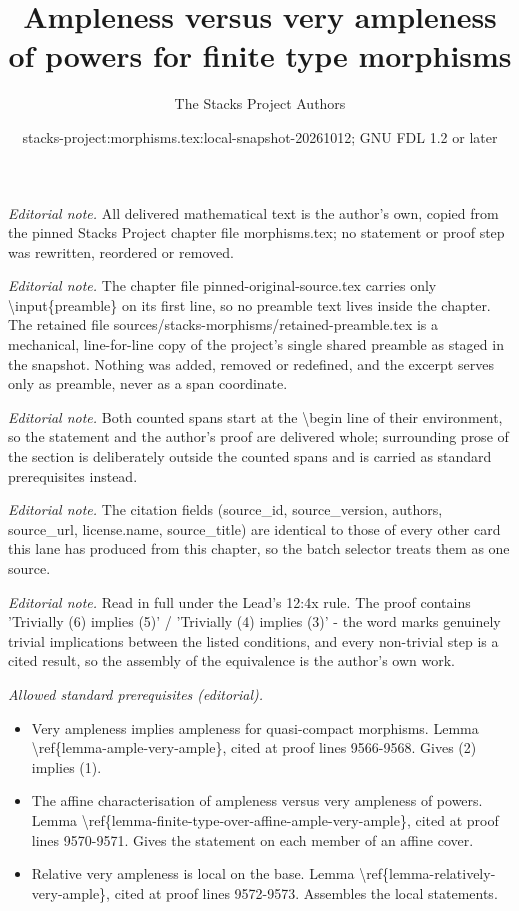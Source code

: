 \documentclass[10pt,a4paper]{amsart}
\title{Ampleness versus very ampleness of powers for finite type morphisms}
\author{The Stacks Project Authors}
\date{stacks-project:morphisms.tex:local-snapshot-20261012; GNU FDL 1.2 or later}
\theoremstyle{plain}
\theoremstyle{definition}
\theoremstyle{remark}
\numberwithin{equation}{subsection}
\begin{document}
\maketitle
\setcounter{subsection}{1}
\noindent\textit{Editorial note.} All delivered mathematical text is the author's own, copied from the pinned Stacks Project chapter file morphisms.tex; no statement or proof step was rewritten, reordered or removed.\par\medskip
\noindent\textit{Editorial note.} The chapter file pinned-original-source.tex carries only \textbackslash{}input\{preamble\} on its first line, so no preamble text lives inside the chapter. The retained file sources/stacks-morphisms/retained-preamble.tex is a mechanical, line-for-line copy of the project's single shared preamble as staged in the snapshot. Nothing was added, removed or redefined, and the excerpt serves only as preamble, never as a span coordinate.\par\medskip
\noindent\textit{Editorial note.} Both counted spans start at the \textbackslash{}begin line of their environment, so the statement and the author's proof are delivered whole; surrounding prose of the section is deliberately outside the counted spans and is carried as standard prerequisites instead.\par\medskip
\noindent\textit{Editorial note.} The citation fields (source\_id, source\_version, authors, source\_url, license.name, source\_title) are identical to those of every other card this lane has produced from this chapter, so the batch selector treats them as one source.\par\medskip
\noindent\textit{Editorial note.} Read in full under the Lead's 12:4x rule. The proof contains 'Trivially (6) implies (5)' / 'Trivially (4) implies (3)' - the word marks genuinely trivial implications between the listed conditions, and every non-trivial step is a cited result, so the assembly of the equivalence is the author's own work.\par\medskip
\noindent\textit{Allowed standard prerequisites (editorial).}\begin{itemize}
\item Very ampleness implies ampleness for quasi-compact morphisms. Lemma \textbackslash{}ref\{lemma-ample-very-ample\}, cited at proof lines 9566-9568. Gives (2) implies (1).
\item The affine characterisation of ampleness versus very ampleness of powers. Lemma \textbackslash{}ref\{lemma-finite-type-over-affine-ample-very-ample\}, cited at proof lines 9570-9571. Gives the statement on each member of an affine cover.
\item Relative very ampleness is local on the base. Lemma \textbackslash{}ref\{lemma-relatively-very-ample\}, cited at proof lines 9572-9573. Assembles the local statements.
\end{itemize}\medskip
\end{document}
